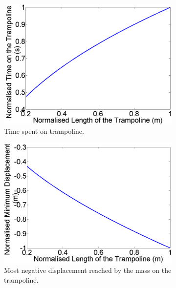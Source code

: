 \begin{figure}[H]
	\centering
    \begin{subfigure}[t]{0.3\textwidth}
		\includegraphics[width=\textwidth]{Norm_Time_LengthTramp.png}
    	\caption{Time spent on trampoline.}\label{fig:Norm_Time_LengthTramp}
    \end{subfigure}\hfill
	\begin{subfigure}[t]{0.3\textwidth}
		\includegraphics[width=\textwidth]{Norm_MinY_LengthTramp.png}
    	\caption{Most negative displacement reached by the mass on the trampoline.}\label{fig:Norm_MinY_LengthTramp}
    \end{subfigure}\hfill
    \begin{subfigure}[t]{0.3\textwidth}

\end{subfigure}
\end{figure}
